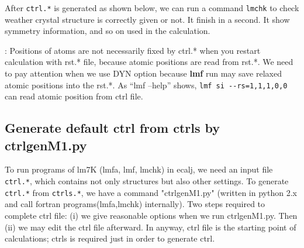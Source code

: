 \documentclass[a4paper,10pt,epsf,fleqn]{article}
\newcommand{\exe}[1]{{\bf #1}}
\newcommand{\io}[1]{{\sf  #1}}
\begin{document}
After \verb+ctrl.*+ is generated as shown below, 
we can run a command \verb+lmchk+ to check weather crystal
structure is correctly given or not. It finish in a second.
It show symmetry information, and so on used in the calculation.

: 
Positions of atoms are not necessarily fixed by \io{ctrl.*} when
you restart calculation with \io{rst.*} file, because 
atomic positions are read from \io{rst.*}.
We need to pay attention when we use DYN option because
\exe{lmf} run may save relaxed atomic positions into the \io{rst.*}.
As ``lmf --help'' shows, \verb#lmf si --rs=1,1,1,0,0# can read atomic
position from ctrl file.


\subsection{Generate default ctrl from ctrls by ctrlgenM1.py}
To run programs of lm7K (lmfa, lmf, lmchk) in ecalj,
we need an input file \verb+ctrl.*+, which contains not only structures
but also other settings.
To generate \verb+ctrl.*+ from \verb+ctrls.*+, we have a command "ctrlgenM1.py" (written
in python 2.x and call fortran programs(lmfa,lmchk) internally).
Two steps required to complete ctrl file:
(i) we give reasonable options when we run ctrlgenM1.py. 
Then (ii) we may edit the ctrl file afterward.
In anyway, ctrl file is the starting point of calculations;
ctrls is required just in order to generate ctrl.
\end{document}
